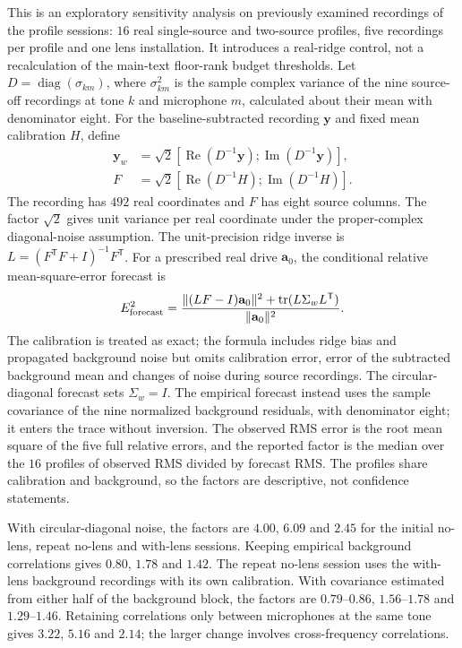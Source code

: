 \documentclass[pdflatex,sn-nature]{sn-jnl}%
\begin{document}
This is an exploratory sensitivity analysis on previously examined recordings of the profile sessions: $16$ real single-source and two-source profiles, five recordings per profile and one lens installation. It introduces a real-ridge control, not a recalculation of the main-text floor-rank budget thresholds. Let $D=\operatorname{diag}(\sigma_{km})$, where $\sigma_{km}^2$ is the sample complex variance of the nine source-off recordings at tone $k$ and microphone $m$, calculated about their mean with denominator eight. For the baseline-subtracted recording $\mathbf y$ and fixed mean calibration $H$, define
\[
 \begin{aligned}
 \mathbf y_w&=\sqrt2[\operatorname{Re}(D^{-1}\mathbf y);
                         \operatorname{Im}(D^{-1}\mathbf y)],\\
 F&=\sqrt2[\operatorname{Re}(D^{-1}H);
               \operatorname{Im}(D^{-1}H)].
 \end{aligned}
\]
The recording has $492$ real coordinates and $F$ has eight source columns. The factor $\sqrt2$ gives unit variance per real coordinate under the proper-complex diagonal-noise assumption. The unit-precision ridge inverse is $L=(F^{\mathsf T}F+I)^{-1}F^{\mathsf T}$. For a prescribed real drive $\mathbf a_0$, the conditional relative mean-square-error forecast is
\begin{equation}
 E_{\rm forecast}^2=\frac{\|(LF-I)\mathbf a_0\|^2+\operatorname{tr}(L\Sigma_wL^{\mathsf T})}{\|\mathbf a_0\|^2}.
 \label{eq:supp_forecast}
\end{equation}
The calibration is treated as exact; the formula includes ridge bias and propagated background noise but omits calibration error, error of the subtracted background mean and changes of noise during source recordings. The circular-diagonal forecast sets $\Sigma_w=I$. The empirical forecast instead uses the sample covariance of the nine normalized background residuals, with denominator eight; it enters the trace without inversion. The observed RMS error is the root mean square of the five full relative errors, and the reported factor is the median over the $16$ profiles of observed RMS divided by forecast RMS. The profiles share calibration and background, so the factors are descriptive, not confidence statements.

With circular-diagonal noise, the factors are $4.00$, $6.09$ and $2.45$ for the initial no-lens, repeat no-lens and with-lens sessions. Keeping empirical background correlations gives $0.80$, $1.78$ and $1.42$. The repeat no-lens session uses the with-lens background recordings with its own calibration. With covariance estimated from either half of the background block, the factors are $0.79$--$0.86$, $1.56$--$1.78$ and $1.29$--$1.46$. Retaining correlations only between microphones at the same tone gives $3.22$, $5.16$ and $2.14$; the larger change involves cross-frequency correlations.
\end{document}
